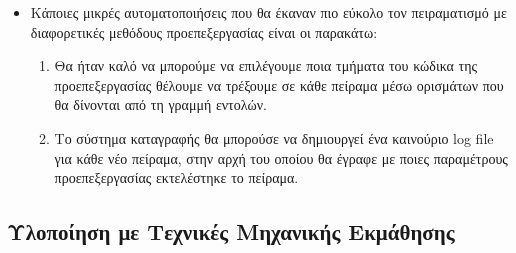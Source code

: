 \begin{itemize}
  \item Κάποιες μικρές αυτοματοποιήσεις που θα έκαναν πιο εύκολο τον πειραματισμό με διαφορετικές μεθόδους προεπεξεργασίας είναι οι παρακάτω:
  \begin{enumerate}
  	\item Θα ήταν καλό να μπορούμε να επιλέγουμε ποια τμήματα του κώδικα της προεπεξεργασίας θέλουμε να τρέξουμε σε κάθε πείραμα μέσω ορισμάτων που θα δίνονται από τη γραμμή εντολών.
  	\item Το σύστημα καταγραφής θα μπορούσε να δημιουργεί ένα καινούριο log file για κάθε νέο πείραμα, στην αρχή του οποίου θα έγραφε με ποιες παραμέτρους προεπεξεργασίας εκτελέστηκε το πείραμα. 
  \end{enumerate} 
\end{itemize}

\subsection{Υλοποίηση με Τεχνικές Μηχανικής Εκμάθησης}
